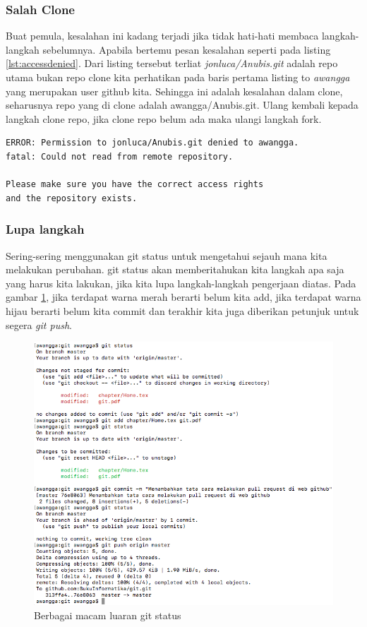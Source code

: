 \subsubsection{Salah Clone}
Buat pemula, kesalahan ini kadang terjadi jika tidak hati-hati membaca langkah-langkah sebelumnya. Apabila bertemu pesan kesalahan seperti pada listing \ref{lst:accessdenied}. Dari listing tersebut terliat \textit{jonluca/Anubis.git} adalah repo utama bukan repo clone kita perhatikan pada baris pertama listing to \textit{awangga} yang merupakan user github kita. Sehingga ini adalah kesalahan dalam clone, seharusnya repo yang di clone adalah awangga/Anubis.git. Ulang kembali kepada langkah clone repo, jika clone repo belum ada maka ulangi langkah fork.
\begin{lstlisting}[caption=Peringatan \textit{Permission denied},label={lst:accessdenied}]
ERROR: Permission to jonluca/Anubis.git denied to awangga.
fatal: Could not read from remote repository.

Please make sure you have the correct access rights
and the repository exists.
\end{lstlisting}



\subsubsection{Lupa langkah}
Sering-sering menggunakan git status untuk mengetahui sejauh mana kita melakukan perubahan. git status akan memberitahukan kita langkah apa saja yang harus kita lakukan, jika kita lupa langkah-langkah pengerjaan diatas. Pada gambar \ref{gitstatus}, jika terdapat warna merah berarti belum kita add, jika terdapat warna hijau berarti belum kita commit dan terakhir kita juga diberikan petunjuk untuk segera \textit{git push}.
\begin{figure}[!htbp]
\centerline{\includegraphics[width=.75\textwidth]{Figures/gitstatus}}
\caption{Berbagai macam luaran git status}
\label{gitstatus}
\end{figure}

